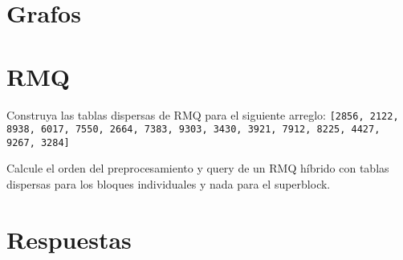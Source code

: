 \documentclass[titlepage,oneside]{book}
\begin{document}
\chapter{Grafos}

\chapter{RMQ}

\begin{Exercise}
	Construya las tablas dispersas de RMQ para el siguiente arreglo: \texttt{[2856, 2122, 8938, 6017, 7550, 2664, 7383, 9303, 3430, 3921, 7912, 8225, 4427, 9267, 3284]}
\end{Exercise}

\begin{Exercise}
	Calcule el orden del preprocesamiento y query de un RMQ híbrido con tablas dispersas para los bloques individuales y nada para el superblock.
\end{Exercise}

\chapter{Respuestas}
\shipoutAnswer

\end{document}

